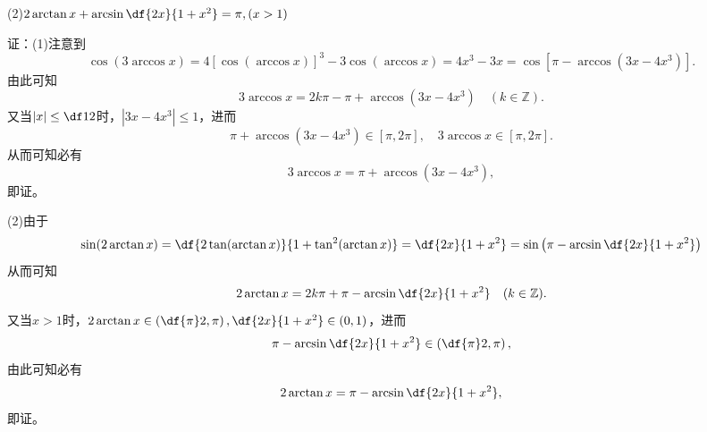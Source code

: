 (2)$2\arctan x+\arcsin\df{2x}{1+x^2}=\pi,(x>1)$

证：(1)注意到
$$\cos(3\arccos x)=4[\cos(\arccos x)]^3-3\cos(\arccos
x)=4x^3-3x=\cos[\pi-\arccos(3x-4x^3)].$$
由此可知
$$3\arccos x=2k\pi-\pi+\arccos(3x-4x^3)\quad(k\in\mathbb{Z}).$$
又当$|x|\leq\df12$时，$|3x-4x^3|\leq 1$，进而
$$\pi+\arccos(3x-4x^3)\in[\pi,2\pi],\quad 3\arccos x\in[\pi,2\pi].$$
从而可知必有
$$3\arccos x=\pi+\arccos(3x-4x^3),$$
即证。

(2)由于
$$\sin(2\arctan x)=\df{2\tan(\arctan x)}{1+\tan^2(\arctan
x)}=\df{2x}{1+x^2}=\sin\left(\pi-\arcsin\df{2x}{1+x^2}\right)$$
从而可知
$$2\arctan x=2k\pi+\pi-\arcsin\df{2x}{1+x^2}\quad(k\in\mathbb{Z}).$$
又当$x>1$时，$2\arctan x\in\left(\df{\pi}2,\pi\right),\df{2x}{1+x^2}\in(0,1)$，进而
$$\pi-\arcsin\df{2x}{1+x^2}\in\left(\df{\pi}2,\pi\right),$$
由此可知必有
$$2\arctan x=\pi-\arcsin\df{2x}{1+x^2},$$
即证。